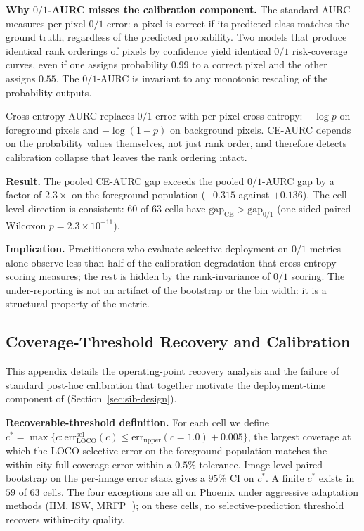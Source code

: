 \textbf{Why $0/1$-AURC misses the calibration component.} The standard AURC measures per-pixel $0/1$ error: a pixel is correct if its predicted class matches the ground truth, regardless of the predicted probability. Two models that produce identical rank orderings of pixels by confidence yield identical $0/1$ risk-coverage curves, even if one assigns probability $0.99$ to a correct pixel and the other assigns $0.55$. The $0/1$-AURC is invariant to any monotonic rescaling of the probability outputs.

Cross-entropy AURC replaces $0/1$ error with per-pixel cross-entropy: $-\log p$ on foreground pixels and $-\log(1-p)$ on background pixels. CE-AURC depends on the probability values themselves, not just rank order, and therefore detects calibration collapse that leaves the rank ordering intact.

\textbf{Result.} The pooled CE-AURC gap exceeds the pooled $0/1$-AURC gap by a factor of $2.3\times$ on the foreground population ($+0.315$ against $+0.136$). The cell-level direction is consistent: $60$ of $63$ cells have $\text{gap}_{\text{CE}} > \text{gap}_{0/1}$ (one-sided paired Wilcoxon $p = 2.3 \times 10^{-11}$).

\textbf{Implication.} Practitioners who evaluate selective deployment on $0/1$ metrics alone observe less than half of the calibration degradation that cross-entropy scoring measures; the rest is hidden by the rank-invariance of $0/1$ scoring. The under-reporting is not an artifact of the bootstrap or the bin width: it is a structural property of the metric.

\subsection{Coverage-Threshold Recovery and Calibration}
\label{app:sp-recovery}

This appendix details the operating-point recovery analysis and the failure of standard post-hoc calibration that together motivate the deployment-time component of \sib{} (Section~\ref{sec:sib-design}).

\textbf{Recoverable-threshold definition.} For each cell we define $c^* = \max\{c : \text{err}_{\text{LOCO}}^{\text{sel}}(c) \leq \text{err}_{\text{upper}}(c{=}1.0) + 0.005\}$, the largest coverage at which the LOCO selective error on the foreground population matches the within-city full-coverage error within a $0.5\%$ tolerance. Image-level paired bootstrap on the per-image error stack gives a $95\%$ CI on $c^*$. A finite $c^*$ exists in $59$ of $63$ cells. The four exceptions are all on Phoenix under aggressive adaptation methods (IIM, ISW, MRFP$^+$); on these cells, no selective-prediction threshold recovers within-city quality.

